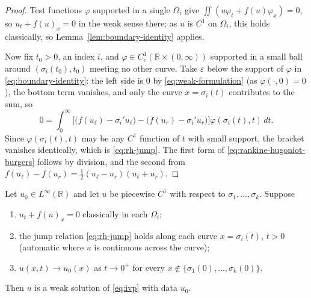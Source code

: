 \begin{proof}
Test functions $\varphi$ supported in a single $\Omega_i$ give
$\iint (u\varphi_t+f(u)\varphi_x)=0$, so $u_t+f(u)_x=0$ in the weak sense
there; as $u$ is $C^1$ on $\Omega_i$, this holds classically, so
Lemma~\ref{lem:boundary-identity} applies.

Now fix $t_0>0$, an index $i$, and $\varphi\in C_c^1(\mathbb{R}\times
(0,\infty))$ supported in a small ball around $(\sigma_i(t_0),t_0)$ meeting no
other curve. Take $\varepsilon$ below the support of $\varphi$ in
\eqref{eq:boundary-identity}: the left side is $0$ by
\eqref{eq:weak-formulation} (as $\varphi(\cdot,0)=0$), the bottom term
vanishes, and only the curve $x=\sigma_i(t)$ contributes to the sum, so
\begin{equation*}
  0=\int_0^\infty\Big[\big(f(u_\ell)-\sigma_i'u_\ell\big)
    -\big(f(u_r)-\sigma_i'u_r\big)\Big]\varphi(\sigma_i(t),t)\,dt .
\end{equation*}
Since $\varphi(\sigma_i(t),t)$ may be any $C^1$ function of $t$ with small
support, the bracket vanishes identically, which is \eqref{eq:rh-jump}.
The first form of \eqref{eq:rankine-hugoniot-burgers} follows by division, and
the second from $f(u_\ell)-f(u_r)=\tfrac12(u_\ell-u_r)(u_\ell+u_r)$.
\end{proof}

\begin{proposition}
\label{prop:piecewise-weak}
Let $u_0\in L^\infty(\mathbb{R})$ and let $u$ be piecewise $C^1$ with
respect to $\sigma_1,\dots,\sigma_k$. Suppose
\begin{enumerate}
  \item[\textup{(i)}] $u_t+f(u)_x=0$ classically in each $\Omega_i$;
  \item[\textup{(ii)}] the jump relation \eqref{eq:rh-jump} holds along
    each curve $x=\sigma_i(t)$, $t>0$ (automatic where $u$ is continuous
    across the curve);
  \item[\textup{(iii)}] $u(x,t)\to u_0(x)$ as
    $t\to0^+$ for every $x\notin\{\sigma_1(0),\dots,\sigma_k(0)\}$.
\end{enumerate}
Then $u$ is a weak solution of \eqref{eq:ivp} with data $u_0$.
\end{proposition}

